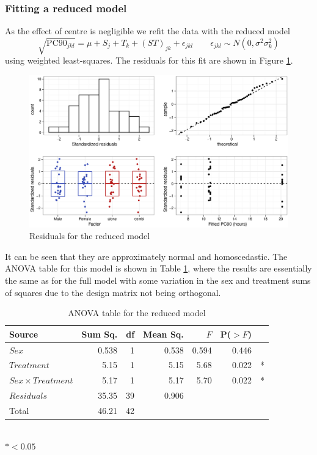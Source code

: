 \pagebreak
\subsubsection*{Fitting a reduced model}
As the effect of centre is negligible we refit the data with the reduced model
\begin{equation}
\sqrt{\mathrm{PC}90_{jkl}}=\mu+S_j+T_k+(ST)_{jk}+\epsilon_{jkl}\quad\quad\epsilon_{jkl}\sim N(0,\sigma^{2}\sigma_{k}^2)\label{reduced}
\end{equation}
using weighted least-squares. The residuals for this fit are shown in Figure \ref{aov2rwt}.
\begin{figure}[h]
\includegraphics[width=6.5in]{aov2rwt.eps} 
\caption{Residuals for the reduced model}
\label{aov2rwt}
\end{figure}

It can be seen that they are approximately normal and homoscedastic. The ANOVA table for this model is shown in Table \ref{aovreduced}, where the results are essentially the same as for the full model with some variation in the sex and treatment sums of squares due to the design matrix not being orthogonal.
\begin{table}[h]
\centering
\caption{ANOVA table for the reduced model}\label{aovreduced}
\begin{tabular}{l|rrrrrl}
Source&Sum Sq.&df&Mean Sq.&$F$&P($>F$)\\
\hline
$Sex$				& 0.538 & 1 & 0.538 & 0.594 & 0.446 & \\
$Treatment$			& 5.15   & 1 & 5.15   & 5.68   & 0.022 & *\\
$Sex\times Treatment$	& 5.17   & 1 & 5.17   & 5.70   & 0.022 & *\\
$Residuals$			& 35.35 & 39 & 0.906 &&&\\
\hline
Total&46.21&42&&&
\end{tabular}\\
$*<0.05$
\end{table}

